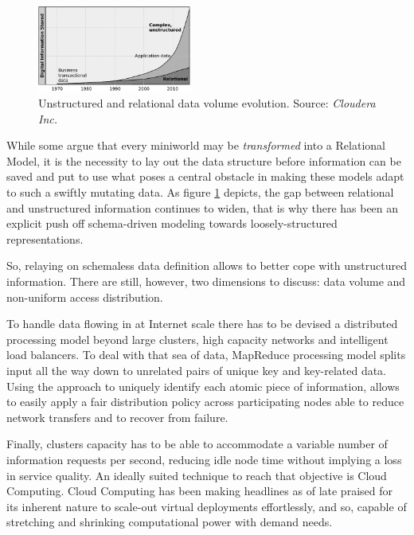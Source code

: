\documentclass[conference]{IEEEtran}
\begin{document}
\begin{figure}[tp]
\centering
\includegraphics[width=0.45\textwidth]{img/001}
\caption{Unstructured and relational data volume evolution. Source: \emph{Cloudera Inc.}}
\label{fig:trend}
\end{figure}

While some argue that every miniworld may be \emph{transformed} into a Relational Model, it is the necessity to lay out the data structure before information can be saved and put to use what poses a central obstacle in making these models adapt to such a swiftly mutating data. As figure \ref{fig:trend} depicts, the gap between relational and unstructured information continues to widen, that is why there has been an explicit push off schema-driven modeling towards loosely-structured representations.

So, relaying on schemaless data definition allows to better cope with unstructured information. There are still, however, two dimensions to discuss: data volume and non-uniform access distribution.

To handle data flowing in at Internet scale there has to be devised a distributed processing model beyond large clusters, high capacity networks and intelligent load balancers. To deal with that sea of data, MapReduce processing model splits input all the way down to unrelated pairs of unique key and key-related data. Using the approach to uniquely identify each atomic piece of information, allows to easily apply a fair distribution policy across participating nodes able to reduce network transfers and to recover from failure.

Finally, clusters capacity has to be able to accommodate a variable number of information requests per second, reducing idle node time without implying a loss in service quality. An ideally suited technique to reach that objective is Cloud Computing. Cloud Computing has been making headlines as of late praised for its inherent nature to scale-out virtual deployments effortlessly, and so, capable of stretching and shrinking computational power with demand needs.
\end{document}
